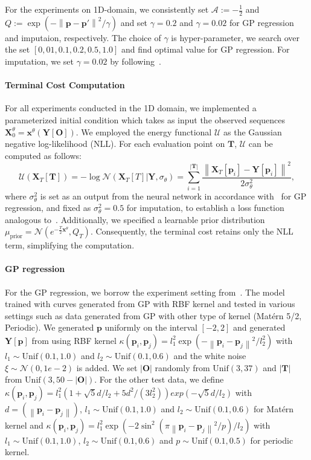\documentclass[nohyperref]{article}
\theoremstyle{plain}
\theoremstyle{remark}
\newcommand{\mc}{\mathcal}
\newcommand{\mb}{\mathbf}
\newcommand{\norm}[1]{\left\lVert#1\right\rVert}
\begin{document}
For the experiments on 1D-domain, we consistently set $\mc{A} := -\frac{1}{2}$ and $Q :=  \exp(-\norm{\mb{p} - \mb{p}'}^2/\gamma)$ and set $\gamma=0.2$ and $\gamma=0.02$ for GP regression and imputaion, respectively. The choice of $\gamma$ is hyper-parameter, we search over the set $[0,01, 0.1, 0.2, 0.5, 1.0]$ and find optimal value for GP regression. For imputation, we set $\gamma=0.02$ by following~\citep{bilovs2023modeling}.
\paragraph{Terminal Cost Computation} For all experiments conducted in the 1D domain, we implemented a parameterized initial condition which takes as input the observed sequences $\mb{X}^{\theta}_0 = \mb{x}^{\theta}(\mb{Y}[\mb{O}])$. We employed the energy functional $\mc{U}$ as the Gaussian negative log-likelihood (NLL). For each evaluation point on $\mb{T}$, $\mc{U}$ can be computed as follows:
\begin{equation}
\mc{U}(\mb{X}_T[\mb{T}]) = -\log \mc{N}(\mb{X}_T[T] | \mb{Y}, \sigma_{\theta}) = \sum_{i=1}^{|\mb{T}|} \frac{\norm{\mb{X}_T[\mb{p}_i] - \mb{Y}[\mb{p}_i]}^2}{2 \sigma^2_{\theta}},
\end{equation}
where $\sigma^2_{\theta}$ is set as an output from the neural network in accordance with~\citep{lee2020bootstrapping} for GP regression, and fixed as $\sigma^2_{\theta}=0.5$ for imputation, to establish a loss function analogous to~\citep{bilovs2023modeling}. Additionally, we specified a learnable prior distribution $\mu_{\text{prior}} = \mc{N}(e^{-\frac{T}{2}\mb{x}^{\theta}}, Q_T)$. Consequently, the terminal cost retains only the NLL term, simplifying the computation.
\paragraph{GP regression} For the GP regression, we borrow the experiment setting from~\citep{lee2020bootstrapping}. The model trained with curves generated from GP with RBF kernel and tested in various settings such as data generated from GP with other type of kernel (Matérn 5/2, Periodic). We generated $\mb{p}$ uniformly on the interval $[-2, 2]$ and generated $\mb{Y}[\mb{p}]$ from using RBF kernel $\kappa(\mb{p}_i, \mb{p}_j) = l^2_1 \exp(-\norm{\mb{p}_i - \mb{p}_j}^2/l^2_2)$ with $l_1 \sim \text{Unif}(0.1, 1.0)$ and $l_2 \sim \text{Unif}(0.1, 0.6)$ and the white noise $\xi \sim \mc{N}(0, 1e-2)$ is added. We set $|\mb{O}|$ randomly from $\text{Unif}(3, 37)$ and $|\mb{T}|$ from $\text{Unif}(3, 50 - |\mb{O}|)$. For the other test data, we define $\kappa(\mb{p}_i, \mb{p}_j) = l^2_1 (1 + \sqrt{5}d/l_2 + 5d^2/(3l^2_2))exp(-\sqrt{5}d/l_2)$ with $d = (\norm{\mb{p}_i - \mb{p}_j})$, $l_1 \sim \text{Unif}(0.1, 1.0)$ and $l_2 \sim \text{Unif}(0.1, 0.6)$ for Matérn kernel and $\kappa(\mb{p}_i, \mb{p}_j) = l^2_1 \exp(-2 \sin^2(\pi\norm{\mb{p}_i - \mb{p}_j}^2/p)/l_2)$ with $l_1 \sim \text{Unif}(0.1, 1.0)$, $l_2 \sim \text{Unif}(0.1, 0.6)$ and $p \sim \text{Unif}(0.1, 0.5)$ for periodic kernel.
\end{document}
